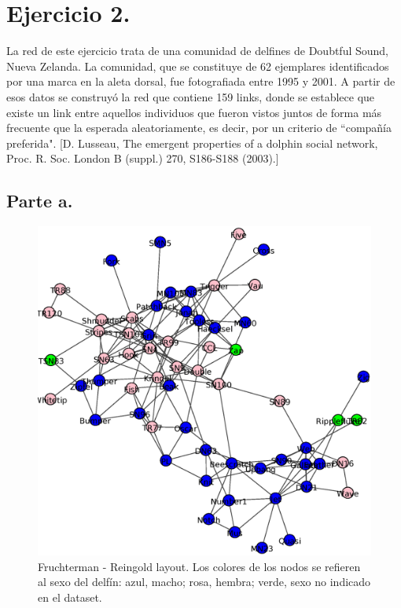 
\section{Ejercicio 2.}

La red de este ejercicio trata de una comunidad de delfines de Doubtful Sound, Nueva Zelanda. La comunidad, que se constituye de 62 ejemplares identificados por una marca en la aleta dorsal, fue fotografiada entre 1995 y 2001. A partir de esos datos se construyó la red que contiene 159 links, donde se establece que existe un link entre aquellos individuos que fueron vistos juntos de forma más frecuente que la esperada aleatoriamente, es decir, por un criterio de ``compañía preferida". [D. Lusseau, The emergent properties of a dolphin social network, Proc. R. Soc. London B (suppl.) 270, S186-S188 (2003).]

\subsection{Parte a.}

\begin{figure}
\centering
\includegraphics[scale = 0.50]{figuras/FrutRein.eps}
\caption{Fruchterman - Reingold layout. Los colores de los nodos se refieren al sexo del delfín: azul, macho; rosa, hembra; verde, sexo no indicado en el dataset.}
\label{fig:Layout_delfines}
\end{figure}

